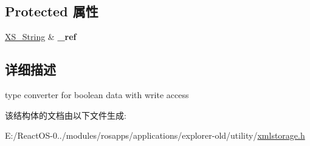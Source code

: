 \subsection*{Protected 属性}
\begin{DoxyCompactItemize}
\item 
\mbox{\label{struct_x_m_l_storage_1_1_x_m_l_bool_ref_a5befa716057b8ad7775cb04cc33d1eba}} 
\hyperlink{struct_x_m_l_storage_1_1_x_s___string}{X\+S\+\_\+\+String} \& {\bfseries \+\_\+ref}
\end{DoxyCompactItemize}


\subsection{详细描述}
type converter for boolean data with write access 

该结构体的文档由以下文件生成\+:\begin{DoxyCompactItemize}
\item 
E\+:/\+React\+O\+S-\/0../modules/rosapps/applications/explorer-\/old/utility/\hyperlink{xmlstorage_8h}{xmlstorage.\+h}\end{DoxyCompactItemize}
